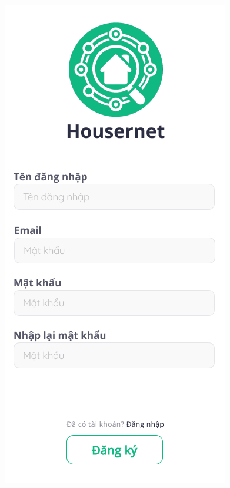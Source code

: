 \begin{figure}[!htb]
\centering
   \begin{minipage}{0.32\textwidth}
     \centering
     \includegraphics[width=1\linewidth]{Images/UI figma/Signup 1.png}

\end{minipage}
\end{figure}

